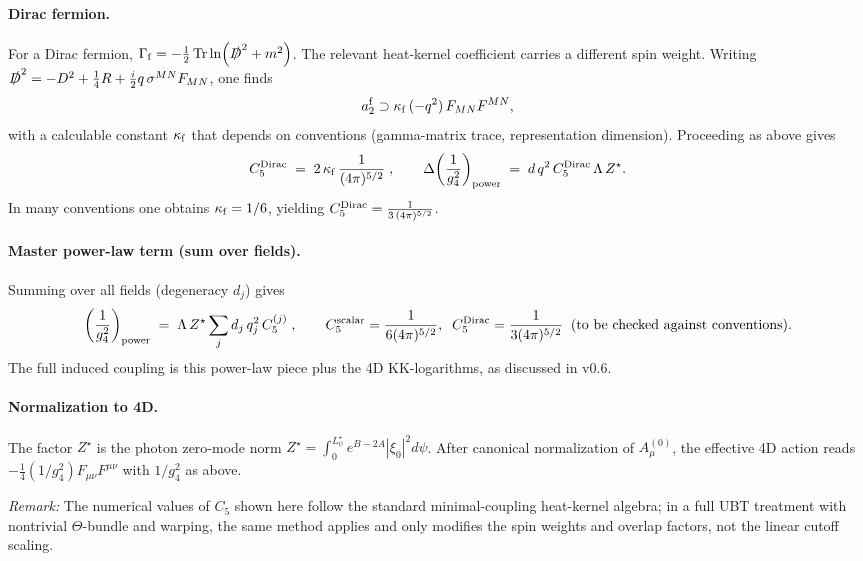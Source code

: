 \documentclass[12pt]{article}
\begin{document}
\paragraph{Dirac fermion.}
For a Dirac fermion, $\Gamma_{\rm f} = -\frac{1}{2}\Tr\ln(\slashed{D}^2 + m^2)$. The relevant heat-kernel coefficient carries a different
spin weight. Writing $\slashed{D}^2 = -D^2 + \frac{1}{4}R + \frac{i}{2}q\,\sigma^{MN}F_{MN}$, one finds
\begin{equation}
a_2^{\rm f} \supset \kappa_{\rm f}\,(-q^2)\,F_{MN}F^{MN},
\end{equation}
with a calculable constant $\kappa_{\rm f}$ that depends on conventions (gamma-matrix trace, representation dimension).
Proceeding as above gives
\begin{equation}
C_5^{\rm Dirac} \;=\; 2\,\kappa_{\rm f}\,\frac{1}{(4\pi)^{5/2}}\;,
\qquad
\Delta\!\left(\frac{1}{g_4^2}\right)_{\rm power} \;=\; d\,q^2\, C_5^{\rm Dirac}\, \Lambda\, Z^\star.
\end{equation}
In many conventions one obtains $\kappa_{\rm f} = 1/6$, yielding $C_5^{\rm Dirac} = \frac{1}{3\,(4\pi)^{5/2}}$.

\paragraph{Master power-law term (sum over fields).}
Summing over all fields (degeneracy $d_j$) gives
\begin{equation}
\left(\frac{1}{g_4^2}\right)_{\rm power} \;=\; \Lambda\, Z^\star \sum_j d_j\,q_j^2\, C_5^{(j)} \;,
\qquad
C_5^{\rm scalar}=\frac{1}{6(4\pi)^{5/2}},\;\;
C_5^{\rm Dirac} = \frac{1}{3(4\pi)^{5/2}} \;\; (\text{to be checked against conventions}).
\end{equation}
The full induced coupling is this power-law piece plus the 4D KK-logarithms, as discussed in v0.6.

\paragraph{Normalization to 4D.}
The factor $Z^\star$ is the photon zero-mode norm $Z^\star=\int_0^{L_\psi^\star} e^{B-2A}|\xi_0|^2 d\psi$. After canonical normalization
of $A_\mu^{(0)}$, the effective 4D action reads $-\tfrac{1}{4}(1/g_4^2)F_{\mu\nu}F^{\mu\nu}$ with $1/g_4^2$ as above.

\bigskip
\noindent\emph{Remark:} The numerical values of $C_5$ shown here follow the standard minimal-coupling heat-kernel algebra; in a full UBT
treatment with nontrivial $\Theta$-bundle and warping, the same method applies and only modifies the spin weights and overlap factors,
not the linear cutoff scaling.
\end{document}
